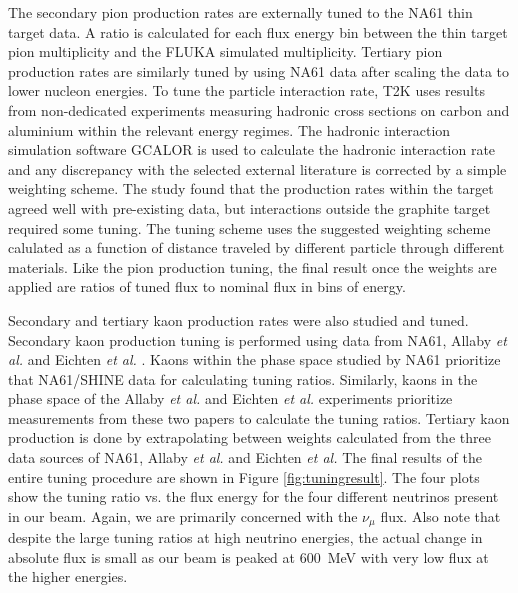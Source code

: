 The secondary pion production rates are externally tuned to the NA61 thin target data. A ratio is calculated for each flux energy bin between the thin target pion multiplicity and the FLUKA simulated multiplicity. Tertiary pion production rates are similarly tuned by using NA61 data after scaling the data to lower nucleon energies. To tune the particle interaction rate, T2K uses results from non-dedicated experiments measuring hadronic cross sections on carbon and aluminium within the relevant energy regimes. The hadronic interaction simulation software GCALOR is used to calculate the hadronic interaction rate and any discrepancy with the selected external literature is corrected by a simple weighting scheme. The study found that the production rates within the target agreed well with pre-existing data, but interactions outside the graphite target required some tuning. The tuning scheme uses the suggested weighting scheme calulated as a function of distance traveled by different particle through different materials. Like the pion production tuning, the final result once the weights are applied are ratios of tuned flux to nominal flux in bins of energy. 

Secondary and tertiary kaon production rates were also studied and tuned. Secondary kaon production tuning is performed using data from NA61, Allaby {\it et al.} \cite{allabyref} and Eichten {\it et al.} \cite{eichtenref}. Kaons within the phase space studied by NA61 prioritize that NA61/SHINE data for calculating tuning ratios. Similarly, kaons in the phase space of the Allaby {\it et al.} and Eichten {\it et al.} experiments prioritize measurements from these two papers to calculate the tuning ratios. Tertiary kaon production is done by extrapolating between weights calculated from the three data sources of NA61, Allaby {\it et al.} and Eichten {\it et al.} The final results of the entire tuning procedure are shown in Figure \ref{fig:tuningresult}. The four plots show the tuning ratio vs. the flux energy for the four different neutrinos present in our beam. Again, we are primarily concerned with the $\nu_\mu$ flux. Also note that despite the large tuning ratios at high neutrino energies, the actual change in absolute flux is small as our beam is peaked at 600~MeV with very low flux at the higher energies.

